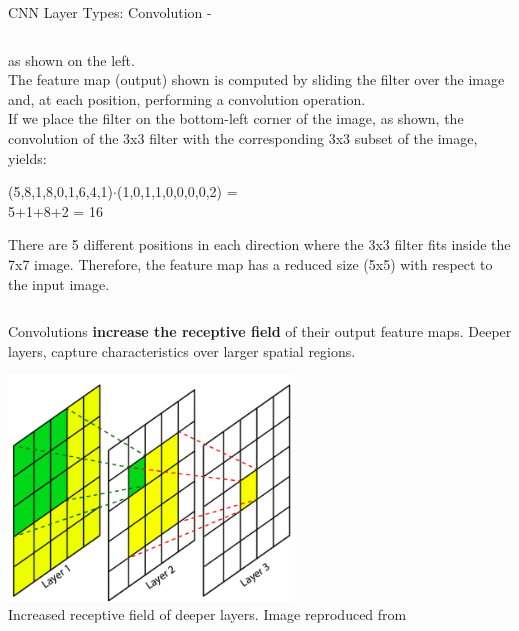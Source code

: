 \begin{frame}[t,allowframebreaks]{CNN Layer Types: Convolution -}
\begin{columns}[t]
\begin{column}{0.50\textwidth}
{\begin{itemize}
{            }
            \end{itemize}
            as shown on the left.\\
            \vspace{0.1cm}
            The feature map (output) shown 
            is computed by sliding the filter over the image and, at each position,
            performing a convolution operation.\\
            \vspace{0.1cm}
            If we place the filter on the bottom-left corner of the 
            image, as shown, the convolution of the 3x3 filter 
            with the corresponding 3x3 subset of the image, yields:
            \vspace{-0.2cm}
            \begin{center} 
            (5,8,1,8,0,1,6,4,1)$\cdot$(1,0,1,1,0,0,0,0,2) =\\ 
            5+1+8+2 = 16\\
            \end{center} 
            \vspace{-0.2cm}
            There are 5 different positions in each direction
            where the 3x3 filter fits inside the 7x7 image.
            Therefore, the feature map has a reduced size (5x5) with respect
            to the input image.\\
        }
        \end{column}
    \end{columns}

    \framebreak

    Convolutions {\bf increase the receptive field} of their output feature maps.
    Deeper layers, capture characteristics over larger spatial regions.
    \begin{center}
        \includegraphics[width=0.57\textwidth]
          {./images/cnn/receptive_field/lin17_3_layers_receptive_field.png}\\
        {\scriptsize 
          Increased receptive field of deeper layers. 
          \color{col:attribution} 
          Image reproduced from \cite{Lin:2017rf}}\\    
    \end{center}      


\end{frame}
